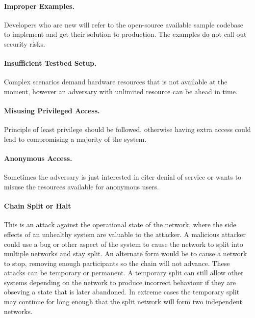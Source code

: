 \paragraph{Improper Examples.} Developers who are new will refer to the open-source available sample codebase to implement and get their solution to production. The examples do not call out security risks.

\paragraph{Insufficient Testbed Setup.} Complex scenarios demand hardware resources that is not available at the moment, however an adversary with unlimited resource can be ahead in time.

\paragraph{Misusing Privileged Access.} Principle of least privilege should be followed, otherwise having extra access could lead to compromising a majority of the system.

\paragraph{Anonymous Access.} Sometimes the adversary is just interested in eiter denial of service or wants to misuse the resources available for anonymous users.

\paragraph{Chain Split or Halt}  This is an attack against the operational state of the network, where the side effects of an unhealthy system are valuable to the attacker.
A malicious attacker could use a bug or other aspect of the system to cause the network to split into multiple networks and stay split.
An alternate form would be to cause a network to stop, removing enough participants so the chain will not advance.
These attacks can be temporary or permanent.
A temporary split can still allow other systems depending on the network to produce incorrect behaviour if they are obseving a state that is later abandoned.
In extreme cases the temporary split may continue for long enough that the split network will form two independent networks.
